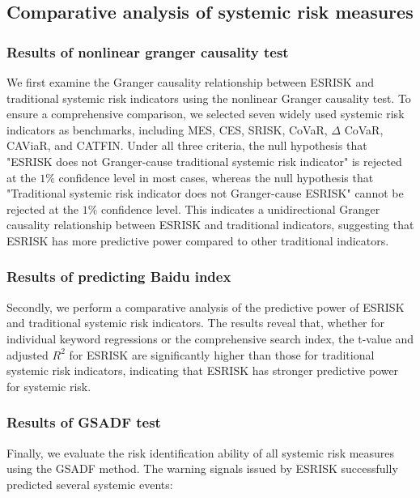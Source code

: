 \documentclass[12pt,a4paper]{article}
\begin{document}
    \subsection{Comparative analysis of systemic risk measures}

    \subsubsection{Results of nonlinear granger causality test}

    We first examine the Granger causality relationship between ESRISK and traditional systemic risk indicators using the nonlinear Granger causality test. To ensure a comprehensive comparison, we selected seven widely used systemic risk indicators as benchmarks, including MES, CES, SRISK, CoVaR, $\Delta$ CoVaR, CAViaR, and CATFIN. Under all three criteria, the null hypothesis that "ESRISK does not Granger-cause traditional systemic risk indicator" is rejected at the $1\%$ confidence level in most cases, whereas the null hypothesis that "Traditional systemic risk indicator does not Granger-cause ESRISK" cannot be rejected at the $1\%$ confidence level. This indicates a unidirectional Granger causality relationship between ESRISK and traditional indicators, suggesting that ESRISK has more predictive power compared to other traditional indicators.

    \subsubsection{Results of predicting Baidu index}

    Secondly, we perform a comparative analysis of the predictive power of ESRISK and traditional systemic risk indicators. The results reveal that, whether for individual keyword regressions or the comprehensive search index, the t-value and adjusted $R^2$ for ESRISK are significantly higher than those for traditional systemic risk indicators, indicating that ESRISK has stronger predictive power for systemic risk.

    \subsubsection{Results of GSADF test}

    Finally, we evaluate the risk identification ability of all systemic risk measures using the GSADF method. The warning signals issued by ESRISK successfully predicted several systemic events:
\end{document}
